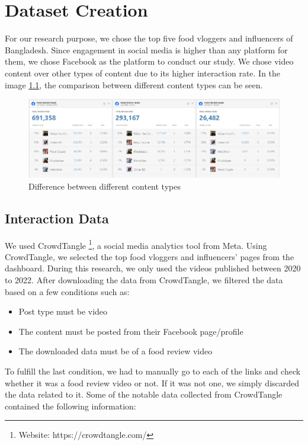 \chapter{Dataset Creation}\label{dataset_creation}

For our research purpose, we chose the top five food vloggers and influencers of Bangladesh. Since engagement in social media is higher than any platform for them, we chose Facebook as the platform to conduct our study. We chose video content over other types of content due to its higher interaction rate. In the image \ref{fig_interaction}, the comparison between different content types can be seen.

\begin{figure}[H]
    \includegraphics[width=\linewidth]{figures/interaction_content_types.png}
    \caption{Difference between different content types}
    \label{fig_interaction}
\end{figure}

\section{Interaction Data}
We used CrowdTangle \footnote{Website: https://crowdtangle.com/}, a social media analytics tool from Meta. Using CrowdTangle, we selected the top food vloggers and influencers' pages from the dashboard. During this research, we only used the videos published between 2020 to 2022. After downloading the data from CrowdTangle, we filtered the data based on a few conditions such as:
\begin{itemize}
    \item {Post type must be video}
    \item {The content must be posted from their Facebook page/profile}
    \item {The downloaded data must be of a food review video}
\end{itemize}

To fulfill the last condition, we had to manually go to each of the links and check whether it was a food review video or not. If it was not one, we simply discarded the data related to it. Some of the notable data collected from CrowdTangle contained the following information:

